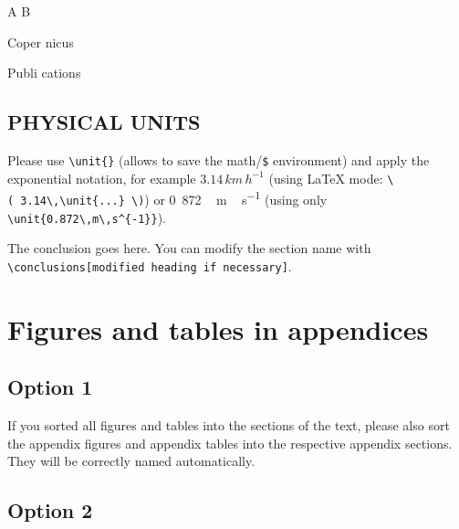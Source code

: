 \documentclass[gc, manuscript]{copernicus}
\begin{document}
\begin{reaction}
A \rightarrow B \\
\end{reaction}
\begin{reaction}
Coper \rightleftharpoons nicus \\
\end{reaction}
\begin{reaction}
Publi \leftrightarrow cations
\end{reaction}

\subsection{PHYSICAL UNITS}

Please use \texttt{\textbackslash{}unit\{\}} (allows to save the math/\texttt{\$} environment) and apply the exponential notation, for example \(3.14\,\unit{km\,h^{-1}}\) (using LaTeX mode: \texttt{\textbackslash{}(\ 3.14\textbackslash{},\textbackslash{}unit\{...\}\ \textbackslash{})}) or \unit{0.872\,m\,s^{-1}} (using only \texttt{\textbackslash{}unit\{0.872\textbackslash{},m\textbackslash{},s\^{}\{-1\}\}}).

\conclusions

The conclusion goes here.
You can modify the section name with \texttt{\textbackslash{}conclusions{[}modified\ heading\ if\ necessary{]}}.








\appendix
\section{Figures and tables in appendices}
\subsection{Option 1}

If you sorted all figures and tables into the sections of the text, please also sort the appendix figures and appendix tables into the respective appendix sections.
They will be correctly named automatically.

\subsection{Option 2}
\end{document}
